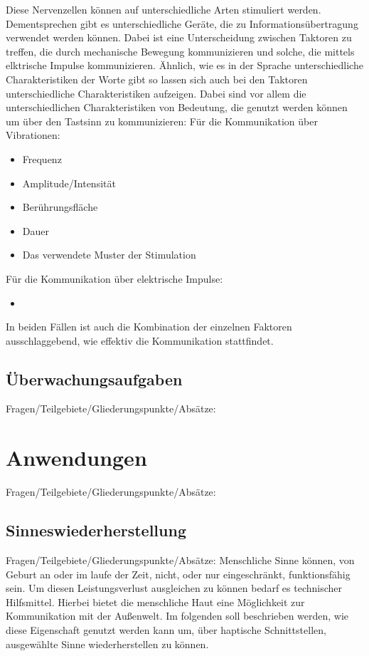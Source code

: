 \documentclass{llncs}					%
\begin{document}
Diese Nervenzellen können auf unterschiedliche Arten stimuliert werden. Dementsprechen gibt es unterschiedliche Geräte, die zu Informationsübertragung verwendet werden können. Dabei ist eine Unterscheidung zwischen Taktoren zu treffen, die durch mechanische Bewegung kommunizieren und solche, die mittels elktrische Impulse kommunizieren. Ähnlich, wie es in der Sprache unterschiedliche Charakteristiken der Worte gibt so lassen sich auch bei den Taktoren unterschiedliche Charakteristiken aufzeigen. Dabei sind vor allem die unterschiedlichen Charakteristiken von Bedeutung, die genutzt werden können um über den Tastsinn zu kommunizieren:
Für die Kommunikation über Vibrationen\cite{doi:10.1518/001872008X250638}:
\begin{itemize}
	\item Frequenz
	\item Amplitude/Intensität %
	\item Berührungsfläche
	\item Dauer
	\item Das verwendete Muster der Stimulation %
\end{itemize}

Für die Kommunikation über elektrische Impulse:
\begin{itemize}
	\item
\end{itemize}

In beiden Fällen ist auch die Kombination der einzelnen Faktoren ausschlaggebend, wie effektiv die Kommunikation stattfindet. 
\subsection{Überwachungsaufgaben}
Fragen/Teilgebiete/Gliederungspunkte/Absätze:

\section{Anwendungen}
Fragen/Teilgebiete/Gliederungspunkte/Absätze:

\subsection{Sinneswiederherstellung}
Fragen/Teilgebiete/Gliederungspunkte/Absätze:
Menschliche Sinne können, von Geburt an oder im laufe der Zeit, nicht, oder nur eingeschränkt, funktionsfähig sein. Um diesen Leistungsverlust ausgleichen zu können bedarf es technischer Hilfsmittel. Hierbei bietet die menschliche Haut eine Möglichkeit zur Kommunikation mit der Außenwelt. Im folgenden soll beschrieben werden, wie diese Eigenschaft genutzt werden kann um, über haptische Schnittstellen, ausgewählte Sinne wiederherstellen zu können.
\end{document}
